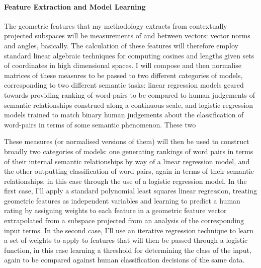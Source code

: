 \paragraph{Feature Extraction and Model Learning} The geometric features that my methodology extracts from contextually projected subspaces will be measurements of and between vectors: vector norms and angles, basically.  The calculation of these features will therefore employ standard linear algebraic techniques for computing cosines and lengths given sets of coordinates in high dimensional spaces.  I will compose and then normalise matrices of these measures to be passed to two different categories of models, corresponding to two different semantic tasks: linear regression models geared towards providing ranking of word-pairs to be compared to human judgements of semantic relationships construed along a continuous scale, and logistic regression models trained to match binary human judgements about the classification of word-pairs in terms of some semantic phenomenon.  These two 

These measures (or normalised versions of them) will then be used to construct broadly two categories of models: one generating rankings of word pairs in terms of their internal semantic relationships by way of a linear regression model, and the other outputting classification of word pairs, again in terms of their semantic relationships, in this case through the use of a logistic regression model.  In the first case, I'll apply a standard polynomial least squares linear regression, treating geometric features as independent variables and learning to predict a human rating by assigning weights to each feature in a geometric feature vector extrapolated from a subspace projected from an analysis of the corresponding input terms.  In the second case, I'll use an iterative regression technique to learn a set of weights to apply to features that will then be passed through a logistic function, in this case learning a threshold for determining the class of the input, again to be compared against human classification decisions of the same data.

